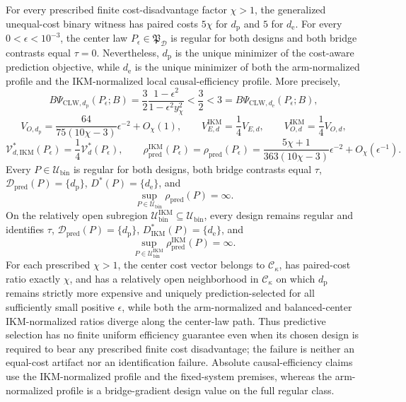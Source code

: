 For every prescribed finite cost-disadvantage factor \(\chi>1\), the generalized unequal-cost binary witness has paired costs \(5\chi\) for \(d_{\mathrm p}\) and \(5\) for \(d_{\mathrm e}\). For every \(0<\epsilon<10^{-3}\), the center law \(P_\epsilon\in\mathfrak P_{\mathcal D}\) is regular for both designs and both bridge contrasts equal \(\tau=0\). Nevertheless, \(d_{\mathrm p}\) is the unique minimizer of the cost-aware prediction objective, while \(d_{\mathrm e}\) is the unique minimizer of both the arm-normalized profile and the IKM-normalized local causal-efficiency profile. More precisely,
\[
 B\Psi_{\mathrm{CLW},d_{\mathrm p}}(P_\epsilon;B)
 =\frac32\frac{1-\epsilon^2}{1-\epsilon^2y_\chi^2}
 <\frac32<3
 =B\Psi_{\mathrm{CLW},d_{\mathrm e}}(P_\epsilon;B),
\]
\[
 V_{O,d_{\mathrm p}}
 =\frac{64}{75(10\chi-3)}\epsilon^{-2}+O_\chi(1),
 \qquad
 V_{E,d}^{\mathrm{IKM}}=\frac14V_{E,d},
 \qquad
 V_{O,d}^{\mathrm{IKM}}=\frac14V_{O,d},
\]
\[
 \mathcal V_{d,\mathrm{IKM}}^*(P_\epsilon)
 =\frac14\mathcal V_d^*(P_\epsilon),
 \qquad
 \rho_{\mathrm{pred}}^{\mathrm{IKM}}(P_\epsilon)
 =\rho_{\mathrm{pred}}(P_\epsilon)
 =\frac{5\chi+1}{363(10\chi-3)}\epsilon^{-2}
 +O_\chi(\epsilon^{-1}).
\]
Every \(P\in\mathcal U_{\mathrm{bin}}\) is regular for both designs, both bridge contrasts equal \(\tau\), \(\mathcal D_{\mathrm{pred}}(P)=\{d_{\mathrm p}\}\), \(D^*(P)=\{d_{\mathrm e}\}\), and
\[
 \sup_{P\in\mathcal U_{\mathrm{bin}}}\rho_{\mathrm{pred}}(P)=\infty.
\]
On the relatively open subregion \(\mathcal U_{\mathrm{bin}}^{\mathrm{IKM}}\subseteq\mathcal U_{\mathrm{bin}}\), every design remains regular and identifies \(\tau\), \(\mathcal D_{\mathrm{pred}}(P)=\{d_{\mathrm p}\}\), \(D_{\mathrm{IKM}}^*(P)=\{d_{\mathrm e}\}\), and
\[
 \sup_{P\in\mathcal U_{\mathrm{bin}}^{\mathrm{IKM}}}
 \rho_{\mathrm{pred}}^{\mathrm{IKM}}(P)=\infty.
\]
For each prescribed \(\chi>1\), the center cost vector belongs to \(\mathcal C_\kappa\), has paired-cost ratio exactly \(\chi\), and has a relatively open neighborhood in \(\mathcal C_\kappa\) on which \(d_{\mathrm p}\) remains strictly more expensive and uniquely prediction-selected for all sufficiently small positive \(\epsilon\), while both the arm-normalized and balanced-center IKM-normalized ratios diverge along the center-law path. Thus predictive selection has no finite uniform efficiency guarantee even when its chosen design is required to bear any prescribed finite cost disadvantage; the failure is neither an equal-cost artifact nor an identification failure. Absolute causal-efficiency claims use the IKM-normalized profile and the fixed-system premises, whereas the arm-normalized profile is a bridge-gradient design value on the full regular class.